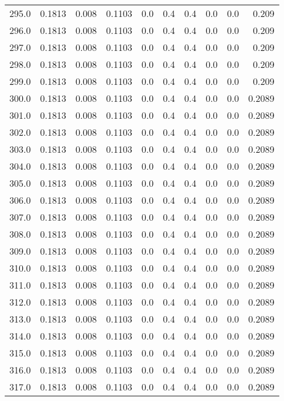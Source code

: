 \begin{longtable}{lrrrrrrrrr}
295.0 & 0.1813 & 0.008 & 0.1103 & 0.0 & 0.4 & 0.4 & 0.0 & 0.0 & 0.209 \\
296.0 & 0.1813 & 0.008 & 0.1103 & 0.0 & 0.4 & 0.4 & 0.0 & 0.0 & 0.209 \\
297.0 & 0.1813 & 0.008 & 0.1103 & 0.0 & 0.4 & 0.4 & 0.0 & 0.0 & 0.209 \\
298.0 & 0.1813 & 0.008 & 0.1103 & 0.0 & 0.4 & 0.4 & 0.0 & 0.0 & 0.209 \\
299.0 & 0.1813 & 0.008 & 0.1103 & 0.0 & 0.4 & 0.4 & 0.0 & 0.0 & 0.209 \\
300.0 & 0.1813 & 0.008 & 0.1103 & 0.0 & 0.4 & 0.4 & 0.0 & 0.0 & 0.2089 \\
301.0 & 0.1813 & 0.008 & 0.1103 & 0.0 & 0.4 & 0.4 & 0.0 & 0.0 & 0.2089 \\
302.0 & 0.1813 & 0.008 & 0.1103 & 0.0 & 0.4 & 0.4 & 0.0 & 0.0 & 0.2089 \\
303.0 & 0.1813 & 0.008 & 0.1103 & 0.0 & 0.4 & 0.4 & 0.0 & 0.0 & 0.2089 \\
304.0 & 0.1813 & 0.008 & 0.1103 & 0.0 & 0.4 & 0.4 & 0.0 & 0.0 & 0.2089 \\
305.0 & 0.1813 & 0.008 & 0.1103 & 0.0 & 0.4 & 0.4 & 0.0 & 0.0 & 0.2089 \\
306.0 & 0.1813 & 0.008 & 0.1103 & 0.0 & 0.4 & 0.4 & 0.0 & 0.0 & 0.2089 \\
307.0 & 0.1813 & 0.008 & 0.1103 & 0.0 & 0.4 & 0.4 & 0.0 & 0.0 & 0.2089 \\
308.0 & 0.1813 & 0.008 & 0.1103 & 0.0 & 0.4 & 0.4 & 0.0 & 0.0 & 0.2089 \\
309.0 & 0.1813 & 0.008 & 0.1103 & 0.0 & 0.4 & 0.4 & 0.0 & 0.0 & 0.2089 \\
310.0 & 0.1813 & 0.008 & 0.1103 & 0.0 & 0.4 & 0.4 & 0.0 & 0.0 & 0.2089 \\
311.0 & 0.1813 & 0.008 & 0.1103 & 0.0 & 0.4 & 0.4 & 0.0 & 0.0 & 0.2089 \\
312.0 & 0.1813 & 0.008 & 0.1103 & 0.0 & 0.4 & 0.4 & 0.0 & 0.0 & 0.2089 \\
313.0 & 0.1813 & 0.008 & 0.1103 & 0.0 & 0.4 & 0.4 & 0.0 & 0.0 & 0.2089 \\
314.0 & 0.1813 & 0.008 & 0.1103 & 0.0 & 0.4 & 0.4 & 0.0 & 0.0 & 0.2089 \\
315.0 & 0.1813 & 0.008 & 0.1103 & 0.0 & 0.4 & 0.4 & 0.0 & 0.0 & 0.2089 \\
316.0 & 0.1813 & 0.008 & 0.1103 & 0.0 & 0.4 & 0.4 & 0.0 & 0.0 & 0.2089 \\
317.0 & 0.1813 & 0.008 & 0.1103 & 0.0 & 0.4 & 0.4 & 0.0 & 0.0 & 0.2089 \\

\end{longtable}
